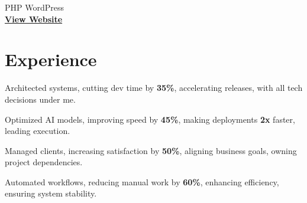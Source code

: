 \documentclass[]{deedy-resume-openfont}
\begin{document}
\begin{minipage}[t]{0.33\textwidth}
    \vspace{6pt}  
    \textbullet{} PHP \textbullet{} WordPress \\  
    \href{http://classiccommercialfinance.com/}{\bf View Website}  




    \end{minipage} 
    \hfill
    \begin{minipage}[t]{0.66\textwidth} 


    \section{Experience}
    \vspace{1em} %

    \vspace{1em}  
    
    \vspace{1em}  
    \begin{tightemize}  
        \item Architected systems, cutting dev time by \textbf{35\%}, accelerating releases, with all tech decisions under me.  
        \item Optimized AI models, improving speed by \textbf{45\%}, making deployments \textbf{2x} faster, leading execution.  
        \item Managed clients, increasing satisfaction by \textbf{50\%}, aligning business goals, owning project dependencies.  
        \item Automated workflows, reducing manual work by \textbf{60\%}, enhancing efficiency, ensuring system stability.  
    \end{tightemize}  
    \vspace{0.5em}  


\end{minipage}
\end{document}

